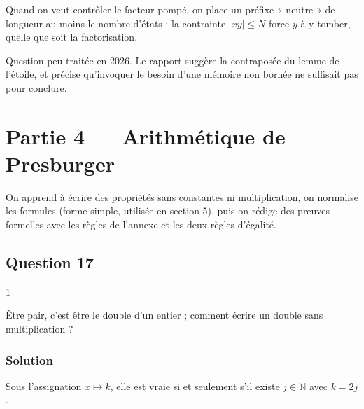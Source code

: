 \documentclass[11pt,a4paper]{article}
\newcommand{\equationajustee}[1]{%
  \sbox{\boiteequation}{$\displaystyle #1$}%
  \ifdim\wd\boiteequation>\linewidth
    \[\resizebox{\linewidth}{!}{\usebox{\boiteequation}}\]%
  \else
    \[#1\]%
  \fi}
\begin{document}
\begin{methode}

Quand on veut contrôler le facteur pompé, on place un préfixe « neutre » de longueur au moins le nombre d'états : la contrainte \(|xy|\le N\) force \(y\) à y tomber, quelle que soit la factorisation.

\end{methode}

\begin{jury}

Question peu traitée en 2026. Le rapport suggère la contraposée du lemme de l'étoile, et précise qu'invoquer le besoin d'une mémoire non bornée ne suffisait pas pour conclure.

\end{jury}

\hypertarget{partie-4-arithmuxe9tique-de-presburger}{%
\section{Partie 4 --- Arithmétique de Presburger}\label{partie-4-arithmuxe9tique-de-presburger}}

On apprend à écrire des propriétés sans constantes ni multiplication, on normalise les formules (forme simple, utilisée en section 5), puis on rédige des preuves formelles avec les règles de l'annexe et les deux règles d'égalité.

\hypertarget{question-17}{%
\subsection{Question 17}\label{question-17}}

\begin{indication}{1}

Être pair, c'est être le double d'un entier ; comment écrire un double sans multiplication ?

\end{indication}

\hypertarget{solution-16}{%
\subsubsection{Solution}\label{solution-16}}

\equationajustee{\boxed{{\mathrm{div}}_2(x):=\exists y.\ x=y+y}}

Sous l'assignation \(x\mapsto k\), elle est vraie si et seulement s'il existe \(j\in\mathbb{N}\) avec \(k=2j\).
\end{document}
